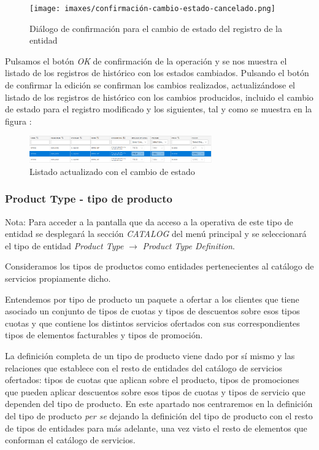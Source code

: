 \begin{figure}[H]
  \centering
  \texttt{[image: imaxes/confirmación-cambio-estado-cancelado.png]}
  \caption{Diálogo de confirmación para el cambio de estado del registro de la entidad}
  \label{fig:confirmación-cambio-estado-cancelado}
\end{figure}


Pulsamos el botón \emph{OK} de confirmación de la operación y se nos muestra el listado de los registros de histórico con los estados cambiados. Pulsando el botón de confirmar la edición se confirman los cambios realizados, actualizándose el listado de los registros de histórico con los cambios producidos, incluido el cambio de estado para el registro modificado y los siguientes, tal y como se muestra en la figura :

\begin{figure}[H]
  \centering
  \includegraphics[width=0.70\textwidth]{imaxes/cambio-estado-cancelado.png}
  \caption{Listado actualizado con el cambio de estado}
  \label{fig:cambio-estado-cancelado}
\end{figure}




\subsubsection{Product Type - tipo de producto}
\label{sub:product-type}

Nota: Para acceder a la pantalla que da acceso a la operativa de este tipo de entidad se desplegará la sección \emph{CATALOG} del menú principal y se seleccionará el tipo de entidad \emph{Product Type} $\rightarrow$ \emph{Product Type Definition}.

Consideramos los tipos de productos como entidades pertenecientes al catálogo de servicios propiamente dicho.

Entendemos por tipo de producto un paquete a ofertar a los clientes que tiene asociado un conjunto de tipos de cuotas y tipos de descuentos sobre esos tipos cuotas y que contiene los distintos servicios ofertados con sus correspondientes tipos de elementos facturables y tipos de promoción.

La definición completa de un tipo de producto viene dado por sí mismo y las relaciones que establece con el resto de entidades del catálogo de servicios ofertados: tipos de cuotas que aplican sobre el producto, tipos de promociones que pueden aplicar descuentos sobre esos tipos de cuotas y tipos de servicio que dependen del tipo de producto. En este apartado nos centraremos en la definición del tipo de producto \textit{per se} dejando la definición del tipo de producto con el resto de tipos de entidades para más adelante, una vez visto el resto de elementos que conforman el catálogo de servicios.


